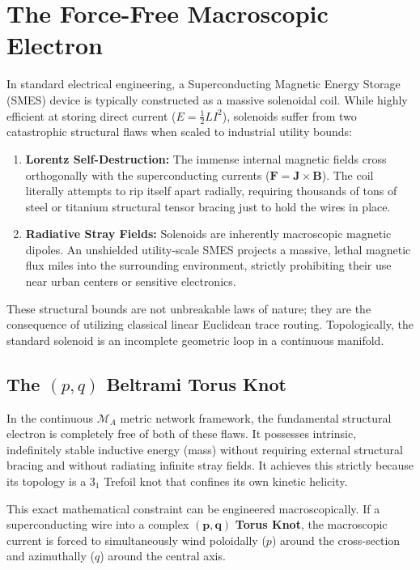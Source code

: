\section{The Force-Free Macroscopic Electron}

In standard electrical engineering, a Superconducting Magnetic Energy Storage (SMES) device is typically constructed as a massive solenoidal coil. While highly efficient at storing direct current ($E = \frac{1}{2} L I^2$), solenoids suffer from two catastrophic structural flaws when scaled to industrial utility bounds:
\begin{enumerate}
    \item \textbf{Lorentz Self-Destruction:} The immense internal magnetic fields cross orthogonally with the superconducting currents ($\mathbf{F} = \mathbf{J} \times \mathbf{B}$). The coil literally attempts to rip itself apart radially, requiring thousands of tons of steel or titanium structural tensor bracing just to hold the wires in place.
    \item \textbf{Radiative Stray Fields:} Solenoids are inherently macroscopic magnetic dipoles. An unshielded utility-scale SMES projects a massive, lethal magnetic flux miles into the surrounding environment, strictly prohibiting their use near urban centers or sensitive electronics.
\end{enumerate}

These structural bounds are not unbreakable laws of nature; they are the consequence of utilizing classical linear Euclidean trace routing. Topologically, the standard solenoid is an incomplete geometric loop in a continuous manifold.

\subsection{The $(p,q)$ Beltrami Torus Knot}
In the continuous $\mathcal{M}_A$ metric network framework, the fundamental structural electron is completely free of both of these flaws. It possesses intrinsic, indefinitely stable inductive energy (mass) without requiring external structural bracing and without radiating infinite stray fields. It achieves this strictly because its topology is a $3_1$ Trefoil knot that confines its own kinetic helicity.

This exact mathematical constraint can be engineered macroscopically. If a superconducting wire into a complex $\mathbf{(p,q)}$ \textbf{Torus Knot}, the macroscopic current is forced to simultaneously wind poloidally ($p$) around the cross-section and azimuthally ($q$) around the central axis.

